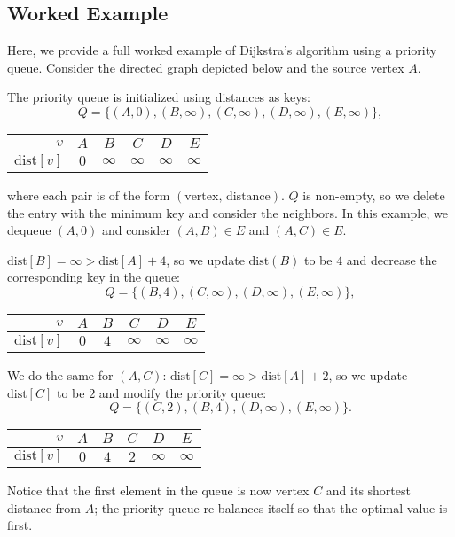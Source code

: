 \documentclass[11pt]{article}
\begin{document}
\subsection{Worked Example}
Here, we provide a full worked example of Dijkstra's algorithm using a priority queue. Consider the directed graph depicted below and the source vertex $A$.
\begin{center}
    
\end{center}
The priority queue is initialized using distances as keys:
\begin{equation*}
    Q = \{(A, 0), (B, \infty), (C, \infty), (D, \infty), (E, \infty)\},
\end{equation*}
\begin{center}
    \begin{tabular}{|r|ccccc|}
        \hline 
        $v$ & $A$ & $B$ & $C$ & $D$ & $E$ \\ \hline 
        $\text{dist}[v]$ & $0$ & $\infty$ & $\infty$ & $\infty$ & $\infty$ \\ \hline 
    \end{tabular}
\end{center}
where each pair is of the form $(\text{vertex, distance})$. $Q$ is non-empty, so we delete the entry with the minimum key and consider the neighbors. In this example, we dequeue $(A, 0)$ and consider $(A, B) \in E$ and $(A, C) \in E$. 

$\text{dist}[B] = \infty > \text{dist}[A] + 4$, so we update $\text{dist}(B)$ to be $4$ and decrease the corresponding key in the queue: 
\begin{equation*}
    Q = \{(B, 4), (C, \infty), (D, \infty), (E, \infty)\},
\end{equation*}
\begin{center}
    \begin{tabular}{|r|ccccc|}
        \hline 
        $v$ & $A$ & $B$ & $C$ & $D$ & $E$ \\ \hline 
        $\text{dist}[v]$ & $0$ & $4$ & $\infty$ & $\infty$ & $\infty$ \\ \hline 
    \end{tabular}
\end{center}
We do the same for $(A, C)$: $\text{dist}[C] = \infty > \text{dist}[A] + 2$, so we update $\text{dist}[C]$ to be $2$ and modify the priority queue:
\begin{equation*}
    Q = \{ (C, 2), (B, 4), (D, \infty), (E, \infty)\}.
\end{equation*}
\begin{center}
    \begin{tabular}{|r|ccccc|}
        \hline 
        $v$ & $A$ & $B$ & $C$ & $D$ & $E$ \\ \hline 
        $\text{dist}[v]$ & $0$ & $4$ & $2$ & $\infty$ & $\infty$ \\ \hline 
    \end{tabular}
\end{center}
Notice that the first element in the queue is now vertex $C$ and its shortest distance from $A$; the priority queue re-balances itself so that the optimal value is first.
\end{document}
